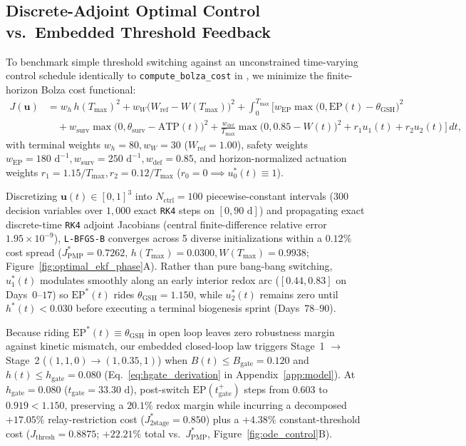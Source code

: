 \documentclass[11pt]{article}
\theoremstyle{plain}
\theoremstyle{remark}
\begin{document}
\subsection{Discrete-Adjoint Optimal Control vs.\ Embedded Threshold Feedback}
To benchmark simple threshold switching against an unconstrained time-varying control schedule identically to \texttt{compute\_bolza\_cost} in , we minimize the finite-horizon Bolza cost functional:
\begin{align}
  J(\mathbf{u}) &= w_h\,h(T_{\max})^2 + w_W\big(W_{\mathrm{ref}} - W(T_{\max})\big)^2 + \int_0^{T_{\max}} \Big[ w_{\mathrm{EP}}\max\!\big(0, \mathrm{EP}(t) - \theta_{\mathrm{GSH}}\big)^2 \nonumber\\
  &\quad + w_{\mathrm{surv}}\max\!\big(0, \theta_{\mathrm{surv}} - \mathrm{ATP}(t)\big)^2 + \frac{w_{\mathrm{def}}}{T_{\max}}\max\!\big(0, 0.85 - W(t)\big)^2 + r_1 u_1(t) + r_2 u_2(t) \Big]\,dt,
  \label{eq:bolza_cost}
\end{align}
with terminal weights $w_h = 80, w_W = 30$ ($W_{\mathrm{ref}} = 1.00$), safety weights $w_{\mathrm{EP}} = 180\text{ d}^{-1}, w_{\mathrm{surv}} = 250\text{ d}^{-1}, w_{\mathrm{def}} = 0.85$, and horizon-normalized actuation weights $r_1 = 1.15/T_{\max}, r_2 = 0.12/T_{\max}$ ($r_0 = 0 \implies u_0^*(t) \equiv 1$).

Discretizing $\mathbf{u}(t) \in [0, 1]^3$ into $N_{\mathrm{ctrl}} = 100$ piecewise-constant intervals ($300$ decision variables over $1{,}000$ exact \texttt{RK4} steps on $[0, 90\text{ d}]$) and propagating exact discrete-time \texttt{RK4} adjoint Jacobians (central finite-difference relative error $1.95 \times 10^{-9}$), \texttt{L-BFGS-B} \cite{byrd1995limited,virtanen2020scipy} converges across 5 diverse initializations within a $0.12\%$ cost spread ($J_{\mathrm{PMP}}^* = 0.7262$, $h(T_{\max}) = 0.0300, W(T_{\max}) = 0.9938$; Figure~\ref{fig:optimal_ekf_phase}A). Rather than pure bang-bang switching, $u_1^*(t)$ modulates smoothly along an early interior redox arc ($[0.44, 0.83]$ on Days~$0\text{--}17$) so $\mathrm{EP}^*(t)$ rides $\theta_{\mathrm{GSH}} = 1.150$, while $u_2^*(t)$ remains zero until $h^*(t) < 0.030$ before executing a terminal biogenesis sprint (Days~$78\text{--}90$).

Because riding $\mathrm{EP}^*(t) \equiv \theta_{\mathrm{GSH}}$ in open loop leaves zero robustness margin against kinetic mismatch, our embedded closed-loop law triggers Stage~1 $\to$ Stage~2 ($(1, 1, 0) \to (1, 0.35, 1)$) when $B(t) \le B_{\mathrm{gate}} = 0.120$ and $h(t) \le h_{\mathrm{gate}} = 0.080$ (Eq.~\ref{eq:hgate_derivation} in Appendix~\ref{app:model}). At $h_{\mathrm{gate}} = 0.080$ ($t_{\mathrm{gate}} = 33.30\text{ d}$), post-switch $\mathrm{EP}(t_{\mathrm{gate}}^+)$ steps from $0.603$ to $0.919 < 1.150$, preserving a $20.1\%$ redox margin while incurring a decomposed $+17.05\%$ relay-restriction cost ($J_{\mathrm{2stage}}^* = 0.850$) plus a $+4.38\%$ constant-threshold cost ($J_{\mathrm{thresh}} = 0.8875$; $+22.21\%$ total vs.\ $J_{\mathrm{PMP}}^*$, Figure~\ref{fig:ode_control}B).
\end{document}

